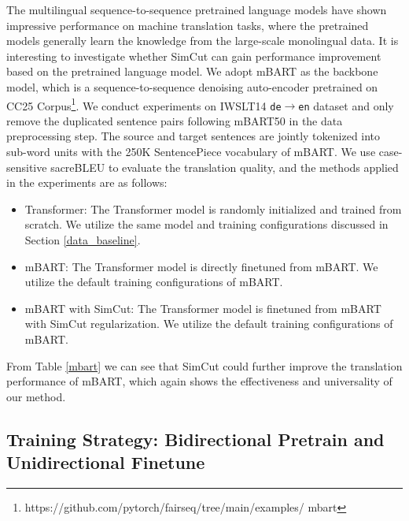 \documentclass[11pt]{article}
\begin{document}
The multilingual sequence-to-sequence pretrained language models \cite{song2019mass, liu2020multilingual, xue-etal-2021-mt5} have shown impressive performance on machine translation tasks, where the pretrained models generally learn the knowledge from the large-scale monolingual data. It is interesting to investigate whether SimCut can gain performance improvement based on the pretrained language model. We adopt mBART \cite{liu2020multilingual} as the backbone model, which is a sequence-to-sequence denoising auto-encoder pretrained on CC25 Corpus\footnote{https://github.com/pytorch/fairseq/tree/main/examples/ mbart}. We conduct experiments on IWSLT14 \texttt{de}$\rightarrow$\texttt{en} dataset and only remove the duplicated sentence pairs following mBART50 \cite{tang2021multilingual} in the data preprocessing step. The source and target sentences are jointly tokenized into sub-word units with the 250K SentencePiece \cite{kudo-richardson-2018-sentencepiece} vocabulary of mBART. We use case-sensitive sacreBLEU \cite{post-2018-call} to evaluate the translation quality, and the methods applied in the experiments are as follows:
\begin{itemize}
\item Transformer: The Transformer model is randomly initialized and trained from scratch. We utilize the same model and training configurations discussed in Section \ref{data_baseline}.
\item mBART: The Transformer model is directly finetuned from mBART. We utilize the default training configurations of mBART.
\item mBART with SimCut: The Transformer model is finetuned from mBART with SimCut regularization. We utilize the default training configurations of mBART.
\end{itemize}
From Table \ref{mbart} we can see that SimCut could further improve the translation performance of mBART, which again shows the effectiveness and universality of our method.





\subsection{Training Strategy: Bidirectional Pretrain and Unidirectional Finetune}
\end{document}

